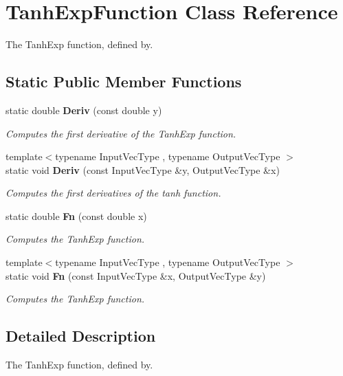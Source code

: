 \section{Tanh\+Exp\+Function Class Reference}
\label{classmlpack_1_1ann_1_1TanhExpFunction}


The Tanh\+Exp function, defined by.  


\subsection*{Static Public Member Functions}
\begin{DoxyCompactItemize}
\item 
static double \textbf{ Deriv} (const double y)
\begin{DoxyCompactList}\small\item\em Computes the first derivative of the Tanh\+Exp function. \end{DoxyCompactList}\item 
{\footnotesize template$<$typename Input\+Vec\+Type , typename Output\+Vec\+Type $>$ }\\static void \textbf{ Deriv} (const Input\+Vec\+Type \&y, Output\+Vec\+Type \&x)
\begin{DoxyCompactList}\small\item\em Computes the first derivatives of the tanh function. \end{DoxyCompactList}\item 
static double \textbf{ Fn} (const double x)
\begin{DoxyCompactList}\small\item\em Computes the Tanh\+Exp function. \end{DoxyCompactList}\item 
{\footnotesize template$<$typename Input\+Vec\+Type , typename Output\+Vec\+Type $>$ }\\static void \textbf{ Fn} (const Input\+Vec\+Type \&x, Output\+Vec\+Type \&y)
\begin{DoxyCompactList}\small\item\em Computes the Tanh\+Exp function. \end{DoxyCompactList}\end{DoxyCompactItemize}


\subsection{Detailed Description}
The Tanh\+Exp function, defined by. 

